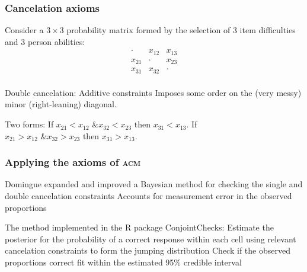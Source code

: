 \documentclass[10pt,serif,professionalfont]{beamer}
\begin{document}
\begin{frame} 
    \frametitle{Cancelation axioms}

    Consider a $3 \times 3$ probability matrix formed by the selection of 3 item difficulties and 3 person abilities:
    \[
    \begin{array}{ccc}
      \cdot&x_{12} &x_{13}  \\
      x_{21}&\cdot&x_{23} \\
      x_{31} & x_{32}&\cdot\\
    \end{array}
    \]

    \begin{outline}
        \1 Double cancelation: Additive constraints 
            \2 Imposes some order on the (very messy) minor (right-leaning) diagonal.  
        
        \vspace{0.1cm}
            
        \1 Two forms:
            \2 If $x_{21}<x_{12} \text{ \& } x_{32}<x_{23} \text{ then } x_{31}<x_{13}$.
            \2 If $x_{21}>x_{12} \text{ \& } x_{32}>x_{23} \text{ then } x_{31}>x_{13}$.

    \end{outline}

\end{frame}

\begin{frame}
    \frametitle{Applying the axioms of \textsc{acm}}

    \begin{outline}
        \1 Domingue expanded and improved a Bayesian method for checking the single and double cancelation constraints
            \2 Accounts for measurement error in the observed proportions

        \vspace{0.25cm}
        
        \1 The method implemented in the R package ConjointChecks: 
            \2 Estimate the posterior for the probability of a correct response within each cell using relevant cancelation constraints to form the jumping distribution
            \2 Check if the observed proportions correct fit within the estimated 95\% credible interval

    \end{outline}

\end{frame}
\end{document}
